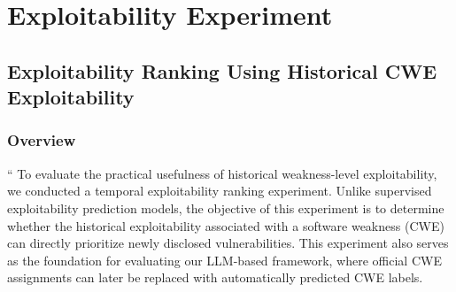 \documentclass[conference,compsoc]{IEEEtran}
\begin{document}







\section{Exploitability Experiment}

\subsection{Exploitability Ranking Using Historical CWE Exploitability}
\label{sec:exploitability-ranking}

\subsubsection{Overview}
``  
To evaluate the practical usefulness of historical weakness-level exploitability, we conducted a temporal exploitability ranking experiment. Unlike supervised exploitability prediction models, the objective of this experiment is to determine whether the historical exploitability associated with a software weakness (CWE) can directly prioritize newly disclosed vulnerabilities. This experiment also serves as the foundation for evaluating our LLM-based framework, where official CWE assignments can later be replaced with automatically predicted CWE labels.
\end{document}
